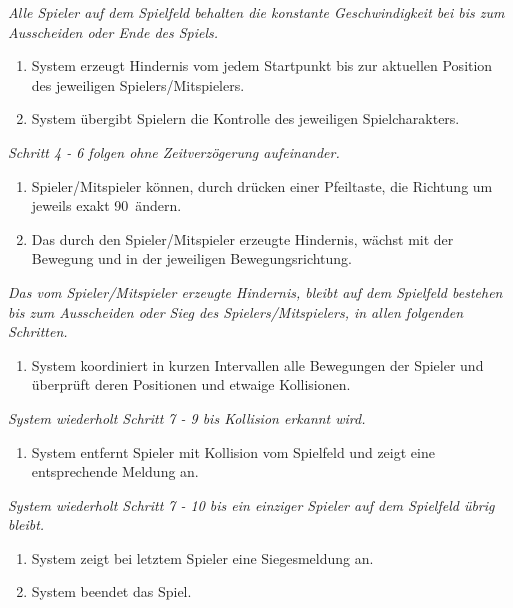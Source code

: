 \documentclass[11pt,ngerman]{article}
\begin{document}
\begin{tcolorbox}
\begin{enumerate}
                \end{enumerate}
                \textit{Alle Spieler auf dem Spielfeld behalten die konstante Geschwindigkeit bei bis zum Ausscheiden oder Ende des Spiels.}
                \begin{enumerate}[resume]
                    \item System erzeugt Hindernis vom jedem Startpunkt bis zur aktuellen Position des jeweiligen Spielers/Mitspielers.
                    \item System übergibt Spielern die Kontrolle des jeweiligen Spielcharakters.
                \end{enumerate}
                \textit{Schritt 4 - 6 folgen ohne Zeitverzögerung aufeinander.}
                \begin{enumerate}[resume]
                    \item Spieler/Mitspieler können, durch drücken einer Pfeiltaste, die Richtung um jeweils exakt 90\textdegree\ ändern.
                    \item Das durch den Spieler/Mitspieler erzeugte Hindernis, wächst mit der Bewegung und in der jeweiligen Bewegungsrichtung.
                \end{enumerate}
                \textit{Das vom Spieler/Mitspieler erzeugte Hindernis, bleibt auf dem Spielfeld bestehen bis zum Ausscheiden oder Sieg des Spielers/Mitspielers, in allen folgenden Schritten.}
                \begin{enumerate}[resume]
                    \item System koordiniert in kurzen Intervallen alle Bewegungen der Spieler und überprüft deren Positionen und etwaige Kollisionen.
                \end{enumerate}
                \textit{System wiederholt Schritt 7 - 9 bis Kollision erkannt wird.}
                \begin{enumerate}[resume]
                    \item System entfernt Spieler mit Kollision vom Spielfeld und zeigt eine entsprechende Meldung an.
                \end{enumerate}
                \textit{System wiederholt Schritt 7 - 10 bis ein einziger Spieler auf dem Spielfeld übrig bleibt.}
                \begin{enumerate}[resume]
                    \item System zeigt bei letztem Spieler eine Siegesmeldung an.
                    \item System beendet das Spiel.

\end{enumerate}
\end{tcolorbox}
\end{document}
